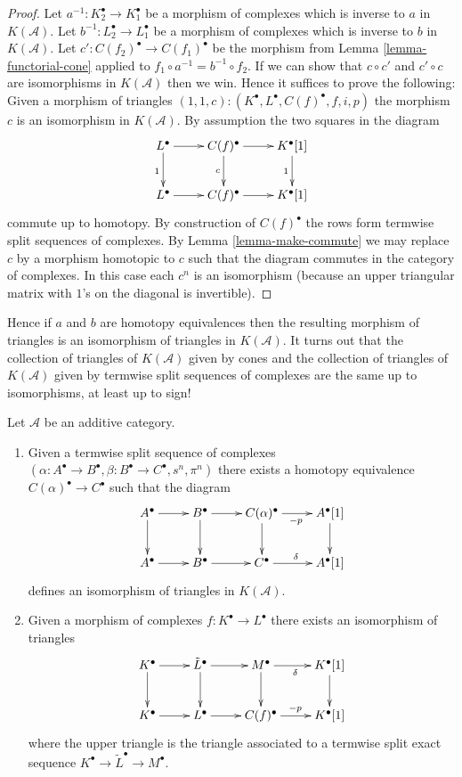 \begin{proof}
Let $a^{-1} : K_2^\bullet \to K_1^\bullet$ be a morphism of complexes which
is inverse to $a$ in $K(\mathcal{A})$.
Let $b^{-1} : L_2^\bullet \to L_1^\bullet$ be a morphism of complexes which
is inverse to $b$ in $K(\mathcal{A})$.
Let $c' : C(f_2)^\bullet \to C(f_1)^\bullet$
be the morphism from Lemma \ref{lemma-functorial-cone} applied
to $f_1 \circ a^{-1} = b^{-1} \circ f_2$. If we can show that
$c \circ c'$ and $c' \circ c$ are isomorphisms in $K(\mathcal{A})$
then we win. Hence it suffices to prove the following: Given
a morphism of triangles
$(1, 1, c) : (K^\bullet, L^\bullet, C(f)^\bullet, f, i, p)$
the morphism $c$ is an isomorphism in $K(\mathcal{A})$.
By assumption the two squares in the diagram
$$
\xymatrix{
L^\bullet \ar[r] \ar[d]_1 &
C(f)^\bullet \ar[r] \ar[d]_c &
K^\bullet[1] \ar[d]_1 \\
L^\bullet \ar[r] &
C(f)^\bullet \ar[r] &
K^\bullet[1]
}
$$
commute up to homotopy. By construction of $C(f)^\bullet$ the rows
form termwise split sequences of complexes.
By Lemma \ref{lemma-make-commute} we may replace $c$ by
a morphism homotopic to $c$ such that the diagram commutes in the
category of complexes. In this case each $c^n$ is an isomorphism
(because an upper triangular matrix with $1$'s on the diagonal is invertible).
\end{proof}

\noindent
Hence if $a$ and $b$ are homotopy equivalences then
the resulting morphism of triangles is an isomorphism of triangles
in $K(\mathcal{A})$.
It turns out that the collection of triangles of $K(\mathcal{A})$
given by cones and the collection of triangles of $K(\mathcal{A})$
given by termwise split sequences of complexes are the same
up to isomorphisms, at least up to sign!

\begin{lemma}
\label{lemma-the-same-up-to-isomorphisms}
Let $\mathcal{A}$ be an additive category.
\begin{enumerate}
\item Given a termwise split sequence of complexes
$(\alpha : A^\bullet \to B^\bullet,
\beta : B^\bullet \to C^\bullet, s^n, \pi^n)$
there exists a homotopy equivalence $C(\alpha)^\bullet \to C^\bullet$
such that the diagram
$$
\xymatrix{
A^\bullet \ar[r] \ar[d] & B^\bullet \ar[d] \ar[r] &
C(\alpha)^\bullet \ar[r]_{-p} \ar[d] & A^\bullet[1] \ar[d] \\
A^\bullet \ar[r] & B^\bullet \ar[r] &
C^\bullet \ar[r]^\delta & A^\bullet[1]
}
$$
defines an isomorphism of triangles in $K(\mathcal{A})$.
\item Given a morphism of complexes $f : K^\bullet \to L^\bullet$
there exists an isomorphism of triangles
$$
\xymatrix{
K^\bullet \ar[r] \ar[d] & \tilde L^\bullet \ar[d] \ar[r] &
M^\bullet \ar[r]_{\delta} \ar[d] & K^\bullet[1] \ar[d] \\
K^\bullet \ar[r] & L^\bullet \ar[r] &
C(f)^\bullet \ar[r]^{-p} & K^\bullet[1]
}
$$
where the upper triangle is the triangle associated to a
termwise split exact sequence $K^\bullet \to \tilde L^\bullet \to M^\bullet$.
\end{enumerate}
\end{lemma}

